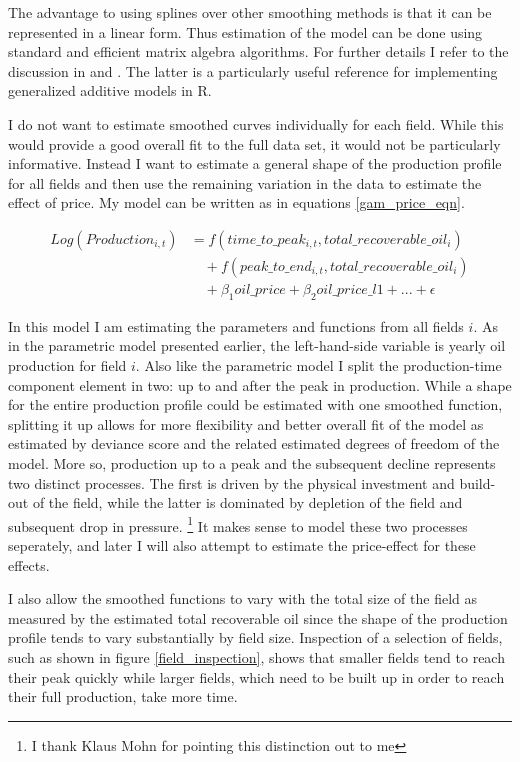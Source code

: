 \documentclass[12pt]{article}
\begin{document}
The advantage to using splines over other smoothing methods is that it can be represented in a linear form.  Thus estimation of the model can be done using standard and efficient matrix algebra algorithms. For further details I refer to the discussion in \citet{hastie_generalized_1990} and \citet{wood_generalized_2006}.  The latter is a particularly useful reference for implementing generalized additive models in R.

I do not want to estimate smoothed curves individually for each field.  While this would provide a good overall fit to the full data set, it would not be particularly informative.  Instead I want to estimate a general shape of the production profile for all fields and then use the remaining variation in the data to estimate the effect of price.  My model can be written as in equations \ref{gam_price_eqn}.

\begin{equation}
\begin{split}
	Log(Production_{i,t})&=f(time\_to\_peak_{i,t}, total\_recoverable\_oil_i) \\
	& \quad + f(peak\_to\_end_{i,t}, total\_recoverable\_oil_i) \\
	& \quad + \beta_1 oil\_price + \beta_2 oil\_price\_l1 + ... +  \epsilon
\end{split}
\label{gam_price_eqn}
\end{equation}

In this model I am estimating the parameters and functions from all fields $i$. As in the parametric model presented earlier, the left-hand-side variable is yearly oil production for field $i$. Also like the parametric model I split the production-time component element in two: up to and after the peak in production. While a shape for the entire production profile could be estimated with one smoothed function, splitting it up allows for more flexibility and better overall fit of the model as estimated by deviance score and the related estimated degrees of freedom of the model.  More so, production up to a peak and the subsequent decline represents two distinct processes.  The first is driven by the physical investment and build-out of the field, while the latter is dominated by depletion of the field and subsequent drop in pressure. \footnote{I thank Klaus Mohn for pointing this distinction out to me} It makes sense to model these two processes seperately, and later I will also attempt to estimate the price-effect for these effects.  

I also allow the smoothed functions to vary with the total size of the field as measured by the estimated total recoverable oil since the shape of the production profile tends to vary substantially by field size.  Inspection of a selection of fields, such as shown in figure \ref{field_inspection}, shows that smaller fields tend to reach their peak quickly while larger fields, which need to be built up in order to reach their full production, take more time.  
\end{document}
